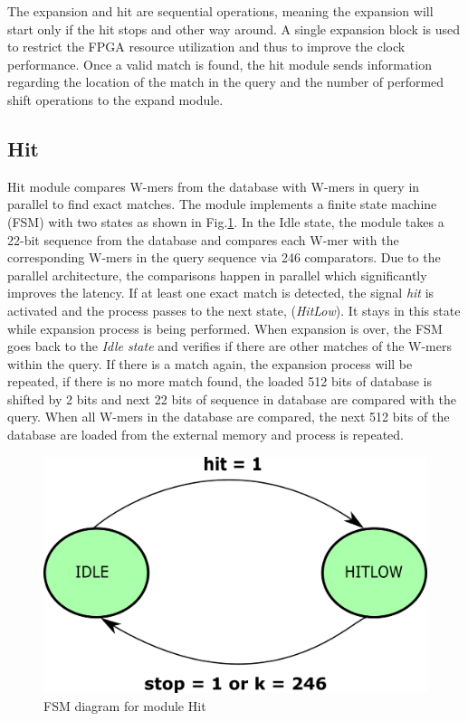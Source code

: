 The expansion and hit are sequential operations, meaning the expansion will start only if the hit stops and other way around. 
A single expansion block is used to restrict the FPGA resource utilization and thus to improve the clock performance.
Once a valid match is found, the hit module sends information regarding the location of the match in the query and the number of performed shift operations to the expand module. 
  
\subsection{Hit}
Hit module compares W-mers from the database with W-mers in query in parallel to find exact matches. 
The module implements a finite state machine (FSM) with two states as shown in Fig.\ref{fig:hitFSM}. 
In the Idle state, the module takes a 22-bit sequence from the database and compares each W-mer with the corresponding W-mers in the query sequence via 246 comparators. 
Due to the parallel architecture, the comparisons happen in parallel which significantly improves the latency. 
If at least one exact match is detected, the signal \textit{hit} is activated and the process passes to the next state, (\textit{HitLow}).
It stays in this state while expansion process is being performed. When expansion is over, the FSM goes back to the \textit{Idle state} and verifies if there are other matches of the W-mers within the query. 
If there is a match again, the expansion process will be repeated, if there is no more match found, the loaded 512 bits of database is shifted by 2 bits and next 22 bits of sequence in database are compared with the query. 
When all W-mers in the database are compared, the next 512 bits of the database are loaded from the external memory and process is repeated. 

\begin{figure}[t!]
\centering
\includegraphics[width=0.7\columnwidth]{Figures/hitFSM.pdf}
\caption{FSM diagram for module Hit} \label{fig:hitFSM}
\end{figure}



